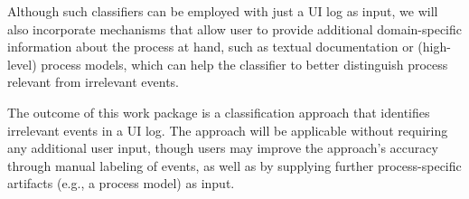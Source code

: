 Although such classifiers can be employed with just a UI log as input, we will also incorporate mechanisms that allow user to provide additional domain-specific information about the process at hand, such as textual documentation or (high-level) process models, which can help the classifier to better distinguish process relevant from irrelevant events.

The outcome of this work package is a classification approach that identifies irrelevant events in a UI log. The approach will be applicable without requiring any additional user input, though users may improve the approach's accuracy through manual labeling of events, as well as by supplying further process-specific artifacts (e.g., a process model) as input.
%
%
